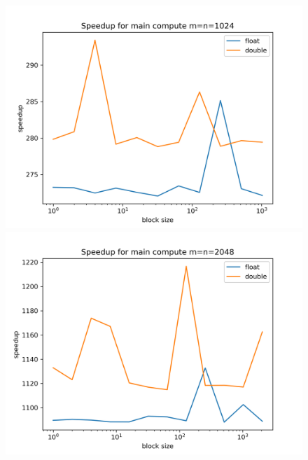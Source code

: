 \documentclass[a4paper]{article}
\begin{document}
	\begin{figure}[h!]
		\centering
		\begin{minipage}{0.45\linewidth}
			\centering
			\includegraphics[width=\linewidth]{../comparison_plots/compute_plot_m1024.png}
		\end{minipage}%
		\begin{minipage}{0.45\linewidth}
			\centering
			\includegraphics[width=\linewidth]{../comparison_plots/compute_plot_m2048.png}
		\end{minipage}
		\vspace{0.5cm} %
		\begin{minipage}{0.45\linewidth}
			\centering

\end{minipage}
\end{figure}
\end{document}
